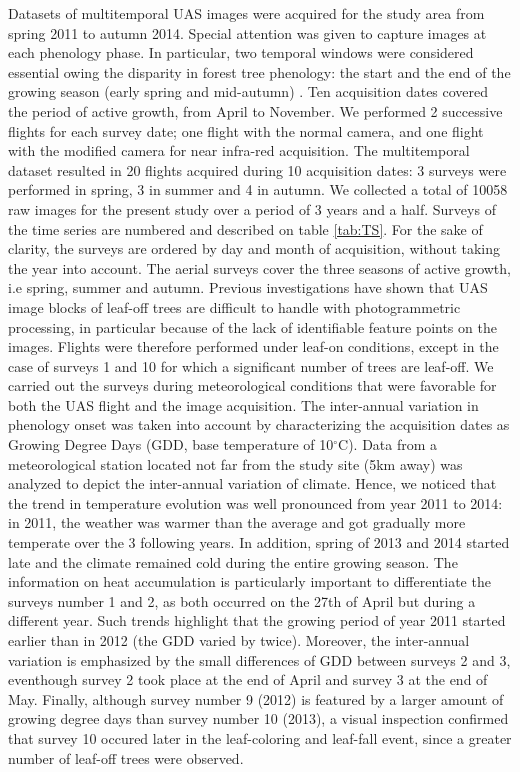 \documentclass[remotesensing,article,submit,moreauthors,pdftex,12pt,a4paper]{mdpi} %
\begin{document}
Datasets of multitemporal UAS images were acquired for the study area from spring 2011 to autumn 2014. 
Special attention was given to capture images at each phenology phase. 
In particular, two temporal windows were considered essential owing the disparity in forest tree phenology: the start and the end of the growing season (early spring and mid-autumn) \cite{hill_mapping_2010, key_comparison_2001}. 
Ten acquisition dates covered the period of active growth, from April to November. 
We performed 2 successive flights for each survey date; one flight with the normal camera, and one flight with the modified camera for near infra-red acquisition. 
The multitemporal dataset resulted in 20 flights acquired during 10 acquisition dates: 3 surveys were performed in spring, 3 in summer and 4 in autumn. 
We collected a total of 10058 raw images for the present study over a period of 3 years and a half. 
Surveys of the time series are numbered and described on table \ref{tab:TS}.
For the sake of clarity, the surveys are ordered by day and month of acquisition, without taking the year into account. 
The aerial surveys cover the three seasons of active growth, i.e spring, summer and autumn. 
Previous investigations have shown that UAS image blocks of leaf-off trees are difficult to handle with photogrammetric processing, in particular because of the lack of identifiable feature points on the images. 
Flights were therefore performed under leaf-on conditions, except in the case of surveys 1 and 10 for which a significant number of trees are leaf-off.
We carried out the surveys during meteorological conditions that were favorable for both the UAS flight and the image acquisition.
The inter-annual variation in phenology onset was taken into account by characterizing the acquisition dates as Growing Degree Days (GDD, base temperature of 10$^{\circ}$C). 
Data from a meteorological station located not far from the study site (5km away) was analyzed to depict the inter-annual variation of climate. 
Hence, we noticed that the trend in temperature evolution was well pronounced from year 2011 to 2014: in 2011, the weather was warmer than the average and got gradually more temperate over the 3 following years. 
In addition, spring of 2013 and 2014 started late and the climate remained cold during the entire growing season. 
The information on heat accumulation is particularly important to differentiate the surveys number 1 and 2, as both occurred on the 27th of April but during a different year. 
Such trends highlight that the growing period of year 2011 started earlier than in 2012 (the GDD varied by twice). 
Moreover, the inter-annual variation is emphasized by the small differences of GDD between surveys 2 and 3, eventhough survey 2 took place at the end of April and survey 3 at the end of May. 
Finally, although survey number 9 (2012) is featured by a larger amount of growing degree days than survey number 10 (2013), a visual inspection confirmed that survey 10 occured later in the leaf-coloring and leaf-fall event, since a greater number of leaf-off trees were observed.
\end{document}

